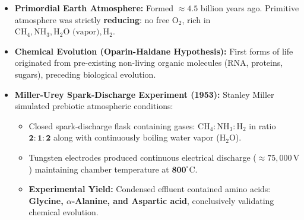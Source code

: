 \documentclass[10pt,a4paper]{article}
\begin{document}
\begin{conceptbox}
\begin{itemize}[leftmargin=*]
  \item \textbf{Primordial Earth Atmosphere:} Formed $\approx 4.5$ billion years ago. Primitive atmosphere was strictly \textbf{reducing}: no free $\mathrm{O_2}$, rich in $\mathrm{CH_4, NH_3, H_2O\text{ (vapor)}, H_2}$.
  \item \textbf{Chemical Evolution (Oparin-Haldane Hypothesis):} First forms of life originated from pre-existing non-living organic molecules (RNA, proteins, sugars), preceding biological evolution.
  \item \textbf{Miller-Urey Spark-Discharge Experiment (1953):} Stanley Miller simulated prebiotic atmospheric conditions:
  \begin{itemize}
    \item Closed spark-discharge flask containing gases: $\mathbf{\mathrm{CH_4 : NH_3 : H_2}}$ in ratio $\mathbf{2 : 1 : 2}$ along with continuously boiling water vapor ($\mathrm{H_2O}$).
    \item Tungsten electrodes produced continuous electrical discharge ($\approx 75,000\,\mathrm{V}$) maintaining chamber temperature at $\mathbf{800^\circ\mathrm{C}}$.
    \item \textbf{Experimental Yield:} Condensed effluent contained amino acids: \textbf{Glycine, $\alpha$-Alanine, and Aspartic acid}, conclusively validating chemical evolution.
  \end{itemize}
\end{itemize}
\end{conceptbox}
\end{document}
